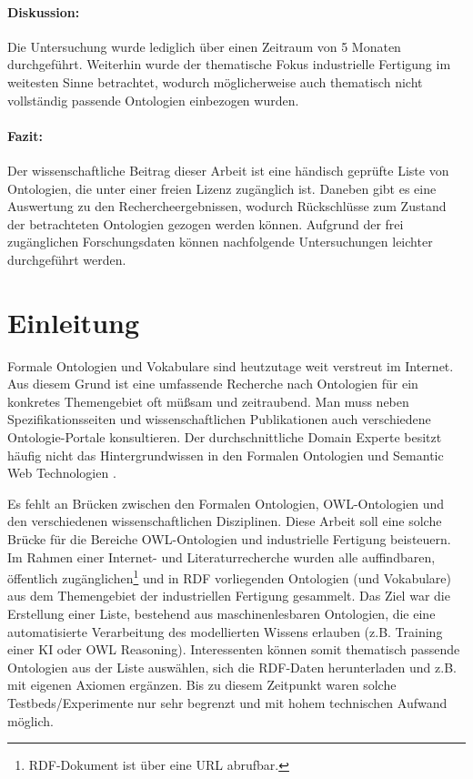 \documentclass{article}
\begin{document}
\paragraph{Diskussion:} Die Untersuchung wurde lediglich über einen Zeitraum von 5 Monaten durchgeführt.
Weiterhin wurde der thematische Fokus industrielle Fertigung im weitesten Sinne betrachtet, wodurch möglicherweise auch thematisch nicht vollständig passende Ontologien einbezogen wurden.

\paragraph{Fazit:} Der wissenschaftliche Beitrag dieser Arbeit ist eine händisch geprüfte Liste von Ontologien, die unter einer freien Lizenz zugänglich ist. Daneben gibt es eine Auswertung zu den Rechercheergebnissen, wodurch Rückschlüsse zum Zustand der betrachteten Ontologien gezogen werden können. Aufgrund der frei zugänglichen Forschungsdaten können nachfolgende Untersuchungen leichter durchgeführt werden.

\newpage

\section{Einleitung}

Formale Ontologien und Vokabulare sind heutzutage weit verstreut im Internet.
Aus diesem Grund ist eine umfassende Recherche nach Ontologien für ein konkretes Themengebiet oft müßsam und zeitraubend.
Man muss neben Spezifikationsseiten und wissenschaftlichen Publikationen auch verschiedene Ontologie-Portale konsultieren.
Der durchschnittliche Domain Experte besitzt häufig nicht das Hintergrundwissen in den Formalen Ontologien und Semantic Web Technologien \cite{sanfilippo2019formal}.

Es fehlt an Brücken zwischen den Formalen Ontologien, OWL-Ontologien und den verschiedenen wissenschaftlichen Disziplinen.
Diese Arbeit soll eine solche Brücke für die Bereiche OWL-Ontologien und industrielle Fertigung beisteuern.
Im Rahmen einer Internet- und Literaturrecherche wurden alle auffindbaren, öffentlich zugänglichen\footnote{RDF-Dokument ist über eine URL abrufbar.} und in RDF vorliegenden Ontologien (und Vokabulare) aus dem Themengebiet der industriellen Fertigung gesammelt.
Das Ziel war die Erstellung einer Liste, bestehend aus maschinenlesbaren Ontologien, die eine automatisierte Verarbeitung des modellierten Wissens erlauben (z.B. Training einer KI oder OWL Reasoning).
Interessenten können somit thematisch passende Ontologien aus der Liste auswählen, sich die RDF-Daten herunterladen und z.B. mit eigenen Axiomen ergänzen.
Bis zu diesem Zeitpunkt waren solche Testbeds/Experimente nur sehr begrenzt und mit hohem technischen Aufwand möglich.
\end{document}
